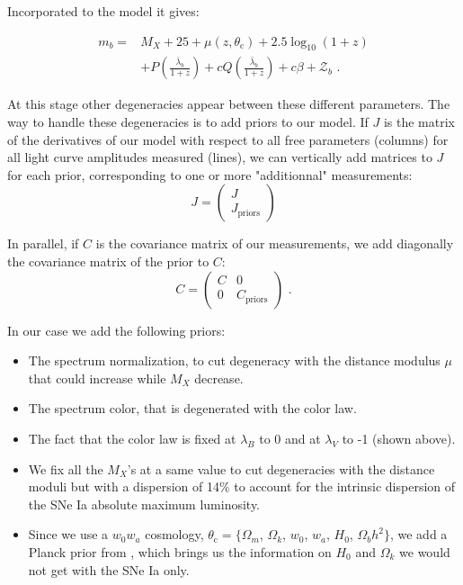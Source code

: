 \documentclass[\docopts]{\docclass}
\begin{document}
Incorporated to the model it gives:

\begin{equation}
\begin{split}
\label{eq::model}
m_b = &M_X + 25 + \mu(z, \theta_\text{c}) + 2.5\log_{10}(1+z) \\
&+ P(\frac{\bar\lambda_b }{1+z}) + cQ(\frac{\bar\lambda_b }{1+z}) + c\beta + \mathcal{Z}_b \text{ .}
\end{split}
\end{equation}

At this stage other degeneracies appear between these different parameters.
The way to handle these degeneracies is to add priors to our model.
If $J$ is the matrix of the derivatives  of our model with respect to all free parameters (columns) for all light curve amplitudes measured (lines), we can vertically add matrices to $J$ for each prior, corresponding to one or more "additionnal" measurements:
\begin{equation}
J =
\begin{pmatrix}
  J \\
  J_\text{priors}
\end{pmatrix} 
\end{equation}

In parallel, if $C$ is the covariance matrix of our measurements, we add diagonally the covariance matrix of the prior to $C$:
\begin{equation}
C =
\begin{pmatrix}
  C & 0 \\
  0 & C_\text{priors}
\end{pmatrix} \text{ .} 
\end{equation}

In our case we add the following priors:
\begin{itemize}
\item The spectrum normalization, to cut degeneracy with the distance modulus $\mu$ that could increase while $M_X$ decrease.
\item The spectrum color, that is degenerated with the color law.
\item The fact that the color law is fixed at $\lambda_B$ to 0 and at $\lambda_V$ to -1 (shown above).
\item We fix all the $M_X$'s at a same value to cut degeneracies with the distance moduli but with a dispersion of 14\% to account for the intrinsic dispersion of the SNe Ia absolute maximum luminosity.
\item Since we use a $w_0w_a$ cosmology, $\theta_\text{c} = \{ \Omega_m$, $\Omega_k$, $w_0$, $w_a$, $H_0$, $\Omega_bh^2 \}$, we add a Planck prior from \cite{1502.01589}, which brings us the information on $H_0$ and $\Omega_k$ we would not get with the SNe Ia only.
\end{itemize}
\end{document}
